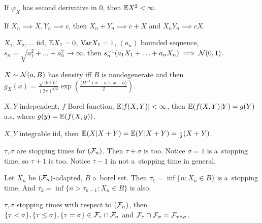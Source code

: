	\begin{proposition}[3.7]
		If $\varphi_X$ has second derivative in $0$, then $\mathbb{E} X^2 < \infty$.
	\end{proposition}
	
	\begin{proposition}[5.9]
		If $X_n \implies X, Y_n \implies c$, 
		then $X_n + Y_n \implies c + X$ and $X_n Y_n \implies cX$.
	\end{proposition}
	
	\begin{proposition}[6.5]
		$X_1, X_2, \ldots$ iid,
		$\mathbb{E} X_1 = 0$, $\mathrm{Var} X_1 = 1$, 
		$(a_n)$ bounded sequence,
		$s_n = \sqrt{a_1^2 + \ldots + a_n^2} \to \infty$, 
		then $s_n^{-1}(a_1 X_1 + \ldots + a_n X_n) \implies \mathcal{N}(0,1)$.
	\end{proposition}
	
	\begin{proposition}[6.7]
		$X \sim \mathcal{N}(a, B)$ has density iff $B$ is nondegenerate
		and then $\displaystyle g_X(x)
		= \frac{\sqrt{\det C}}{(2 \pi)^{d/2}}
		\exp \left( \frac{ \langle B^{-1}(x-a), x-a\rangle}{2} \right)$.
	\end{proposition}
	
	\begin{proposition}[7.6]
		$X, Y$ independent, $f$ Borel function, $\mathbb{E} |f(X,Y)| < \infty$,
		then $\mathbb{E}(f(X,Y) | Y) = g(Y)$ a.s. where $g(y) = \mathbb{E}(f(X, y))$.
	\end{proposition}
	
	\begin{proposition}[7.7]
		$X, Y$ integrable iid,
		then $\mathbb{E}(X|X+Y) = \mathbb{E}(Y|X+Y) = \frac{1}{2} (X+Y)$.
	\end{proposition}
	
	\begin{proposition}[8.1]
		$\tau, \sigma$ are stopping times for $(\mathcal{F}_n)$.
		Then $\tau + \sigma$ is too.
		Notice $\sigma=1$ is a~stopping time, so $\tau+1$ is too.
		Notice $\tau - 1$ in not a~stopping time in general.
	\end{proposition}
	
	\begin{proposition}[8.2]
		Let $X_n$ be $(\mathcal{F}_n)$-adapted, $B$ a~borel set.
		Then $\tau_1 = \inf\{n:X_n \in B\}$ is a~stopping time.
		And $\tau_k = \inf\{n>\tau_{k-1}: X_n \in B\}$ is also.
	\end{proposition}
	
	\begin{proposition}[8.3]
		$\tau, \sigma$ stopping times with respect to $(\mathcal{F}_n)$,
		then $\{\tau < \sigma\}, \{\tau \leq \sigma\}, \{\tau = \sigma\}
			\in \mathcal{F}_\tau \cap \mathcal{F}_\sigma$
		and $\mathcal{F}_\tau \cap \mathcal{F}_\sigma = \mathcal{F}_{\tau \wedge \sigma}$.
	\end{proposition}
	
